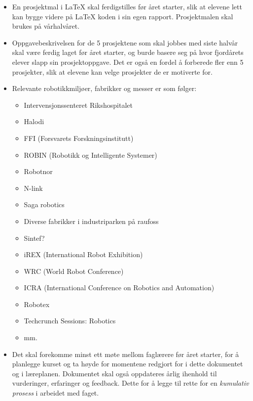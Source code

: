 \begin{itemize}
        \item En prosjektmal i LaTeX skal ferdigstilles før året starter, slik at elevene lett kan bygge videre på LaTeX koden i sin egen rapport. Prosjektmalen skal brukes på vårhalvåret.

        \item Oppgavebeskrivelsen for de 5 prosjektene som skal jobbes med siste halvår skal være ferdig laget før året starter, og burde basere seg på hvor fjordårets elever slapp sin prosjektoppgave. Det er også en fordel å forberede fler enn 5 prosjekter, slik at elevene kan velge prosjekter de er motiverte for.

        \item Relevante robotikkmiljøer, fabrikker og messer er som følger:

            \begin{itemize}
                \item Intervensjonssenteret Rikshospitalet
                \item Halodi
                \item FFI (Forsvarets Forskningsinstitutt)
                \item ROBIN (Robotikk og Intelligente Systemer)
                \item Robotnor
                \item N-link
                \item Saga robotics
                \item Diverse fabrikker i industriparken på raufoss
                \item Sintef?
                \item iREX (International Robot Exhibition)
                \item WRC (World Robot Conference)
                \item ICRA (International Conference on Robotics and Automation)
                \item Robotex
                \item Techcrunch Sessions: Robotics
                \item mm.
            \end{itemize}

        \item Det skal forekomme minst ett møte mellom faglærere før året starter, for å planlegge kurset og ta høyde for momentene redgjort for i dette dokumentet og i læreplanen. Dokumentet skal også oppdateres årlig ihenhold til vurderinger, erfaringer og feedback. Dette for å legge til rette for en \emph{kumulativ prosess} i arbeidet med faget.

    \end{itemize}
